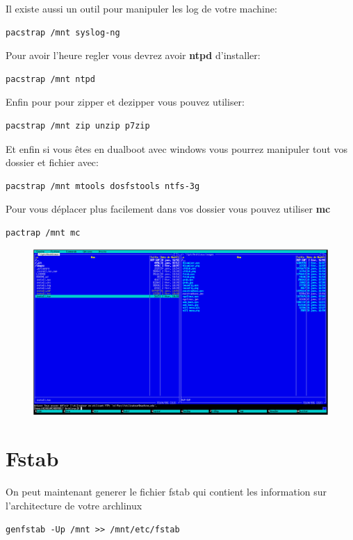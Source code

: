 \documentclass[a4paper]{book}
\begin{document}
Il existe aussi un outil pour manipuler les log de votre machine\@:\\
\begin{lstlisting}
pacstrap /mnt syslog-ng
\end{lstlisting}
Pour avoir l'heure regler vous devrez avoir \textbf{ntpd} d'installer\@:\\
\begin{lstlisting}
pacstrap /mnt ntpd
\end{lstlisting}
Enfin pour pour zipper et dezipper vous pouvez utiliser\@:\\
\begin{lstlisting}
pacstrap /mnt zip unzip p7zip
\end{lstlisting}
Et enfin si vous êtes en dualboot avec windows vous pourrez manipuler tout vos
dossier et fichier avec\@:\\
\begin{lstlisting}
pacstrap /mnt mtools dosfstools ntfs-3g
\end{lstlisting}
Pour vous déplacer plus facilement dans vos dossier vous pouvez utiliser
\textbf{mc}\\
\begin{lstlisting}
pactrap /mnt mc
\end{lstlisting}

\begin{figure}[h]
  \includegraphics[width=\textwidth]{images/mc}
\end{figure}

\section{Fstab}
On peut maintenant generer le fichier fstab qui contient les information sur
l'architecture de votre archlinux\\
\begin{lstlisting}
genfstab -Up /mnt >> /mnt/etc/fstab
\end{lstlisting}
\end{document}
